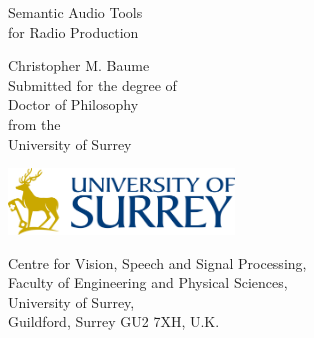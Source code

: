 \documentclass[11pt,a4paper]{report}
\begin{document}
\begin{titlepage}
  \vspace*{\fill}
  \begin{center}
    {\Huge Semantic Audio Tools\\for Radio Production\par\vspace{1.5cm}}
    {\Large Christopher M. Baume}\\[1cm]
    {\large Submitted for the degree of\\Doctor of Philosophy\\from the\\
      University of Surrey}\\[1cm]
    \begin{center}
      \includegraphics[width=6cm]{figs/surrey-logo.png}\\[1cm]
    \end{center}
    {\small Centre for Vision, Speech and Signal Processing,\\
      Faculty of Engineering and Physical Sciences,\\
      University of Surrey,\\
      Guildford, Surrey GU2 7XH, U.K.}
  \end{center}
  \vspace*{\fill}
\end{titlepage}





{\singlespacing
\tableofcontents
}



\listoffigures

\listoftables

















\begin{appendices}
  \renewcommand\chaptername{Appendix}
  
\end{appendices}

\printbibliography
\end{document}
